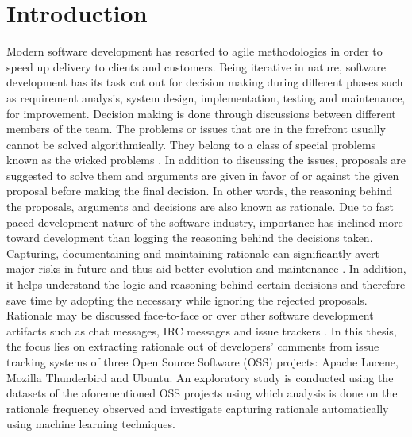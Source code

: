 \documentclass[a4paper,12pt,twoside]{report}
\begin{document}

\chapter{Introduction}
Modern software development has resorted to agile methodologies in order to speed up delivery to clients and customers. Being iterative in nature, software development has its task cut out for decision making during different phases such as requirement analysis, system design, implementation, testing and maintenance, for improvement. Decision making is done through discussions between different members of the team. The problems or issues that are in the forefront usually cannot be solved algorithmically. They belong to a class of special problems known as the wicked problems \cite{Rittel1973}. In addition to discussing the issues, proposals are suggested to solve them and arguments are given in favor of or against the given proposal before making the final decision. In other words, the reasoning behind the proposals, arguments and decisions are also known as rationale. 
\bigbreak
Due to fast paced development nature of the software industry, importance has inclined more toward development than logging the reasoning behind the decisions taken. Capturing, documentaining and maintaining rationale can significantly avert major risks in future and thus aid better evolution and maintenance \cite{Bruegge2009} \cite{Dutoit2006}. In addition, it helps understand the logic and reasoning behind certain decisions and therefore save time by adopting the necessary while ignoring the rejected proposals. Rationale may be discussed face-to-face or over other software development artifacts such as chat messages, IRC messages and issue trackers \cite{Lata2016} \cite{Nonnenmacher2017} \cite{Panichella2014}.  
\bigbreak
In this thesis, the focus lies on extracting rationale out of developers' comments from issue tracking systems of three Open Source Software (OSS) projects: Apache Lucene, Mozilla Thunderbird and Ubuntu. An exploratory study is conducted using the datasets of the aforementioned OSS projects using which analysis is done on the rationale frequency observed and investigate capturing rationale automatically using machine learning techniques. 
\end{document}
